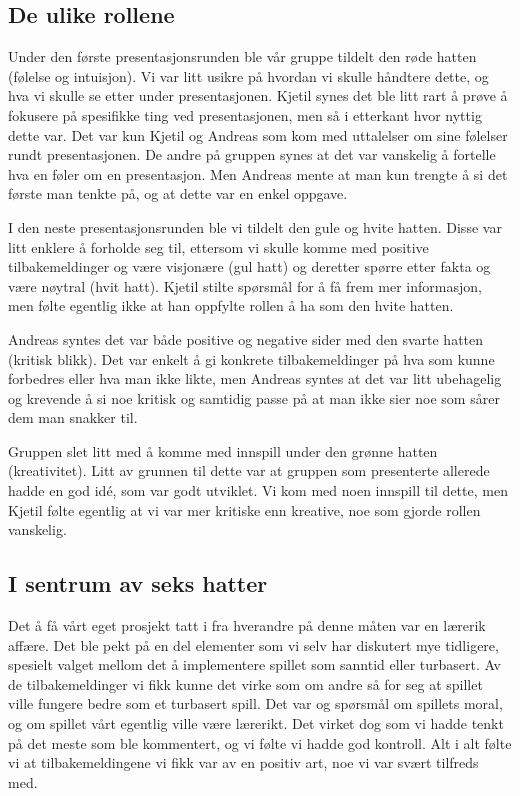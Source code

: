 \subsection{De ulike rollene}
Under den første presentasjonsrunden ble vår gruppe tildelt den røde hatten (følelse og intuisjon). Vi var litt usikre på hvordan vi skulle håndtere dette, og hva vi skulle se etter under presentasjonen. Kjetil synes det ble litt rart å prøve å fokusere på spesifikke ting ved presentasjonen, men så i etterkant hvor nyttig dette var. Det var  kun Kjetil og Andreas som kom med uttalelser om sine følelser rundt presentasjonen. De andre på gruppen synes at det var vanskelig å fortelle hva en føler om en presentasjon. Men Andreas mente at man kun trengte å si det første man tenkte på, og at dette var en enkel oppgave. 

I den neste presentasjonsrunden ble vi tildelt den gule og hvite hatten. Disse var litt enklere å forholde seg til, ettersom vi skulle komme med positive tilbakemeldinger og være visjonære (gul hatt) og deretter spørre etter fakta og være nøytral (hvit hatt). Kjetil stilte spørsmål for å få frem mer informasjon, men følte egentlig ikke at han oppfylte rollen å ha som den hvite hatten.

Andreas syntes det var både positive og negative sider med den svarte hatten (kritisk blikk). Det var enkelt å gi konkrete tilbakemeldinger på hva som kunne forbedres eller hva man ikke likte, men Andreas syntes at det var litt ubehagelig og krevende å si noe kritisk og samtidig passe på at man ikke sier noe som sårer dem man snakker til.

Gruppen slet litt med å komme med innspill under den grønne hatten (kreativitet). Litt av grunnen til dette var at gruppen som presenterte allerede hadde en god idé, som var godt utviklet. Vi kom med noen innspill til dette, men Kjetil følte egentlig at vi var mer kritiske enn kreative, noe som gjorde rollen vanskelig.


\subsection{I sentrum av seks hatter}
Det å få vårt eget prosjekt tatt i fra hverandre på denne måten var en lærerik affære. Det ble pekt på en del elementer som vi selv har diskutert mye tidligere, spesielt valget mellom det å implementere spillet som sanntid eller turbasert. Av de tilbakemeldinger vi fikk kunne det virke som om andre så for seg at spillet ville fungere bedre som et turbasert spill. Det var og spørsmål om spillets moral, og om spillet vårt egentlig ville være lærerikt. Det virket dog som vi hadde tenkt på det meste som ble kommentert, og vi følte vi hadde god kontroll. Alt i alt følte vi at tilbakemeldingene vi fikk var av en positiv art, noe vi var svært tilfreds med. 

